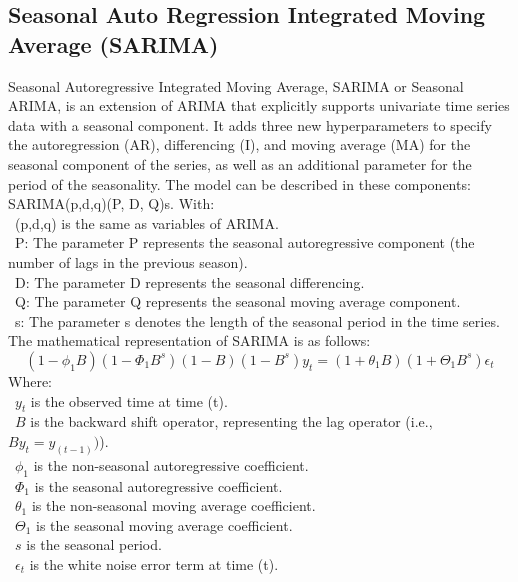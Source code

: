 \documentclass{ieeeojies}
\begin{document}
\subsection{Seasonal Auto Regression Integrated Moving Average (SARIMA)}
Seasonal Autoregressive Integrated Moving Average, SARIMA or Seasonal ARIMA, is an extension of ARIMA that explicitly supports univariate time series data with a seasonal component. It adds three new hyperparameters to specify the autoregression (AR), differencing (I), and moving average (MA) for the seasonal component of the series, as well as an additional parameter for the period of the seasonality.
The model can be described in these components: SARIMA(p,d,q)(P, D, Q)s.
With:\\
\indent\textbullet\ (p,d,q) is the same as variables of ARIMA. \\
\indent\textbullet\ P: The parameter P represents the seasonal autoregressive component (the number of lags in the previous season). \\
\indent\textbullet\ D: The parameter D represents the seasonal differencing. \\
\indent\textbullet\ Q: The parameter Q represents the seasonal moving average component. \\
\indent\textbullet\ s: The parameter s denotes the length of the seasonal period in the time series.\\
The mathematical representation of SARIMA is as follows:
\[(1-\phi_1 B)(1-\Phi_1 B^s)(1-B)(1-B^s)y_t=(1+\theta_1 B)(1+\Theta_1 B^s)\epsilon_t\]
Where:\\
\indent\textbullet\ \(y_t\) is the observed time at time (t). \\
\indent\textbullet\ \(B\) is the backward shift operator, representing the lag operator (i.e.,\(By_t=y_(t-1))\)). \\
\indent\textbullet\ \(\phi_1\) is the non-seasonal autoregressive coefficient. \\
\indent\textbullet\ \(\Phi_1\) is the seasonal autoregressive coefficient. \\
\indent\textbullet\ \(\theta_1\) is the non-seasonal moving average coefficient. \\
\indent\textbullet\ \(\Theta_1\) is the seasonal moving average coefficient. \\
\indent\textbullet\ \(s\) is the seasonal period. \\
\indent\textbullet\ \(\epsilon_t\)  is the white noise error term at time (t).
\end{document}
